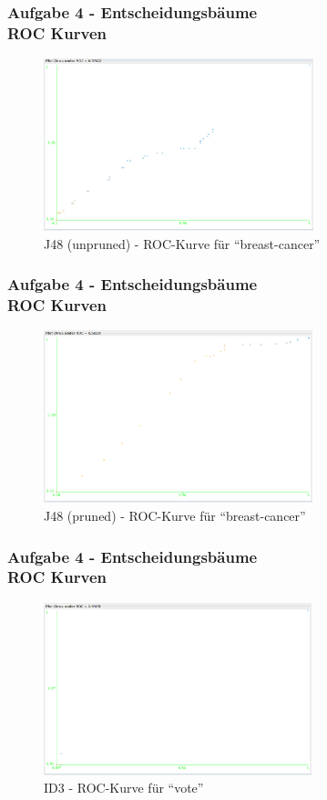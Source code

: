\documentclass[accentcolor=tud6b,colorbacktitle,inverttitle,landscape,german,presentation,t]{tudbeamer}
\begin{document}
    \begin{frame}[t]
    \frametitle{Aufgabe 4 - Entscheidungsbäume\\ ROC Kurven}
        \begin{figure}[htbp]
            \centering
            \includegraphics[height=5cm]{breastcancer-j48-unpruned}
            \caption{J48 (unpruned) - ROC-Kurve für ``breast-cancer''}
        \end{figure}
    \end{frame}
    
    \begin{frame}[t]
    \frametitle{Aufgabe 4 - Entscheidungsbäume\\ ROC Kurven}
        \begin{figure}[htbp]
            \centering
            \includegraphics[height=5cm]{breastcancer-j48-pruned}
            \caption{J48 (pruned) - ROC-Kurve für ``breast-cancer''}
        \end{figure}
    \end{frame}
    
    \begin{frame}[t]
    \frametitle{Aufgabe 4 - Entscheidungsbäume\\ ROC Kurven}
        \begin{figure}[htbp]
            \centering
            \includegraphics[height=5cm]{vote-id3}
            \caption{ID3 - ROC-Kurve für ``vote''}
        \end{figure}
    \end{frame}
    
\end{document}
